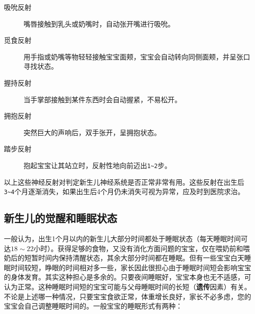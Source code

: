 
\begin{description}
\item[吸吮反射] 嘴唇接触到乳头或奶嘴时，自动张开嘴进行吸吮。
\item[觅食反射] 用手指或奶嘴等物轻轻接触宝宝面颊，宝宝会自动转向同侧面颊，并呈张口寻找状态。
\item[握持反射] 当手掌部接触到某件东西时会自动握紧，不易松开。
\item[拥抱反射] 突然巨大的声响后，双手张开，呈拥抱状态。
\item[踏步反射] 抱起宝宝让其站立时，反射性地向前迈出\texttt{1\textasciitilde{}2}\hspace{0pt}步。
\end{description}

以上这些神经反射对判定新生儿神经系统是否正常非常有用。这些反射在出生后\texttt{3\textasciitilde{}4}\hspace{0pt}个月逐渐消失，如果出生后4个月仍未消失可视为异常，应及时到医院求治。



\subsection{新生儿的觉醒和睡眠状态}

一般认为，出生1个月以内的新生儿大部分时间都处于睡眠状态（每天睡眠时间可达$18\sim{}22$小时）。获得足够的食物，又没有消化方面问题的宝宝，仅在喂奶前和喂奶后的短暂时间内保持清醒状态，其余大部分时间都在睡眠。但有一些宝宝白天睡眠时间较短，睁眼的时间相对多一些，家长因此很担心由于睡眠时间短会影响宝宝的身体发育。其实这种担心是多余的。只要夜间睡眠好，宝宝本身也无不适感，可认为正常。这种睡眠时间短的宝宝可能与父母睡眠时间的长短（\textbf{遗传}因素）有关。不论是上述哪一种情况，只要宝宝食欲正常，体重增长良好，家长不必多虑，您的宝宝会自己调整睡眠时间的。一般宝宝的睡眠形式有两种：

